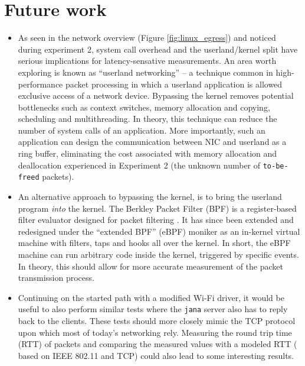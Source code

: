 \section{Future work}

\begin{itemize}

\item As seen in the network overview (Figure \ref{fig:linux_egress}) and
noticed during experiment 2, system call overhead and the userland/kernel
split have serious implications for latency-sensative measurements. An area
worth exploring is known as ``userland networking'' -- a technique common in
high-performance packet processing in which a userland application is allowed
exclusive access of a network device. Bypassing the kernel removes potential
bottlenecks such as context switches, memory allocation and copying,
scheduling and multithreading. In theory, this technique can reduce the number
of system calls of an application. More importantly, such an application can
design the communication between NIC and userland as a ring buffer,
eliminating the cost associated with memory allocation and deallocation
experienced in Experiment 2 (the unknown number of \texttt{to-be-freed}
packets).

\item An alternative approach to bypassing the kernel, is to bring the
userland program \emph{into} the kernel. The Berkley Packet Filter (BPF) is a
register-based filter evaluator designed for packet filtering
\cite{10.5555/1267303.1267305}. It has since been extended and redesigned
under the ``extended BPF'' (eBPF) moniker as an in-kernel virtual machine with
filters, taps and hooks all over the kernel. In short, the eBPF machine can
run arbitrary code inside the kernel, triggered by specific events. In theory,
this should allow for more accurate measurement of the packet transmission
process.


\item Continuing on the started path with a modified Wi-Fi driver, it would be
useful to also perform similar tests where the \texttt{jana} server also has
to reply back to the clients. These tests should more closely mimic the TCP
protocol upon which most of today's networking rely. Measuring the round trip
time (RTT) of packets and comparing the measured values with a modeled RTT (
based on IEEE 802.11 and TCP) could also lead to some interesting results.



\end{itemize}
